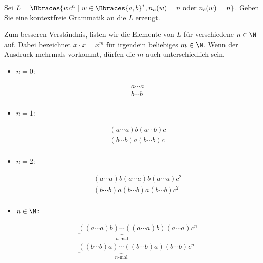 
\begin{exercise}

Sei $L = \Bbraces{w c^n \mid w \in \Bbraces{a, b}^\ast, n_a(w) = n ~\text{oder}~ n_b(w) = n}$.
Geben Sie eine kontextfreie Grammatik an die $L$ erzeugt.

\end{exercise}


\begin{solution}

Zum besseren Verständnis, listen wir die Elemente von $L$ für verschiedene $n \in \N$ auf.
Dabei bezeichnet $x \cdot x = x^m$ für irgendein beliebiges $m \in \N$.
Wenn der Ausdruck mehrmals vorkommt, dürfen die $m$ auch unterschiedlich sein.

\begin{itemize}

    \item $n = 0$:
    
    \begin{align*}
        a \cdots a \\
        b \cdots b \\
    \end{align*}

    \item $n = 1$:
    
    \begin{align*}
        (a \cdots a) b (a \cdots b) c \\
        (b \cdots b) a (b \cdots b) c \\
    \end{align*}

    \item $n = 2$:
    
    \begin{align*}
        (a \cdots a) b (a \cdots a) b (a \cdots a) c^2 \\
        (b \cdots b) a (b \cdots b) a (b \cdots b) c^2 \\
    \end{align*}

    \item $n \in \N$:
    
    \begin{align*}
        \underbrace
        {
            ((a \cdots a) b)
            \cdots
            ((a \cdots a) b)
        }_{
            \text{$n$-mal}
        }
        (a \cdots a)
        c^n \\
        \underbrace
        {
            ((b \cdots b) a)
            \cdots
            ((b \cdots b) a)
        }_{
            \text{$n$-mal}
        }
        (b \cdots b)
        c^n \\
    \end{align*}
\end{itemize}


\end{solution}
